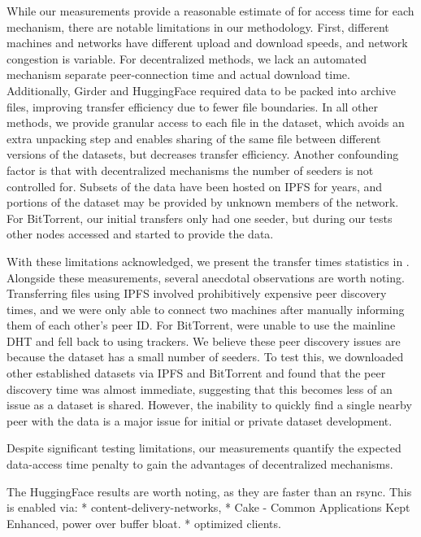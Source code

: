 \documentclass{article}
\begin{document}
While our measurements provide a reasonable estimate of for access time for each mechanism, there are
  notable limitations in our methodology.
First, different machines and networks have different upload and download speeds, and network congestion is
  variable.
For decentralized methods, we lack an automated mechanism separate peer-connection time and actual download
  time.
Additionally, Girder and HuggingFace required data to be packed into archive
  files, improving transfer efficiency due to fewer file boundaries.
In all other methods, we provide granular access to each file in the dataset, which avoids an extra
  unpacking step and enables sharing of the same file between different versions of the datasets, but
  decreases transfer efficiency.
Another confounding factor is that with decentralized mechanisms the number of seeders is not controlled
  for.
Subsets of the data have been hosted on IPFS for years, and portions of the dataset may be provided by
  unknown members of the network.
For BitTorrent, our initial transfers only had one seeder, but during our tests other nodes accessed and
  started to provide the data.

With these limitations acknowledged, we present the transfer times statistics in .
Alongside these measurements, several anecdotal observations are worth noting.
Transferring files using IPFS involved prohibitively expensive peer discovery times, and we were only able
  to connect two machines after manually informing them of each other's peer ID.
For BitTorrent, were unable to use the mainline DHT and fell back to using trackers.
We believe these peer discovery issues are because the dataset has a small number of seeders.
To test this, we downloaded other established datasets via IPFS and BitTorrent and found that the peer
  discovery time was almost immediate, suggesting that this becomes less of an issue as a dataset is shared.
However, the inability to quickly find a single nearby peer with the data is a major issue for initial or
  private dataset development.

Despite significant testing limitations, our measurements quantify the expected data-access time penalty to
  gain the advantages of decentralized mechanisms.

The HuggingFace results are worth noting, as they are faster than an rsync. 
This is enabled via:
* content-delivery-networks,
* Cake - Common Applications Kept Enhanced, power over buffer bloat.
* optimized clients.
\end{document}
